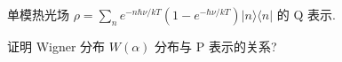 \documentclass{assignment}
\begin{document}
\begin{prob}
    单模热光场 $\rho=\sum_ne^{-n\hbar\nu/kT}(1-e^{-\hbar\nu/kT})\lvert n\rangle\langle n\rvert$ 的 Q 表示.
\end{prob}
\begin{sol}
    
\end{sol}

\begin{prob}
    证明 Wigner 分布 $W(\alpha)$ 分布与 P 表示的关系?
\end{prob}
\begin{pf}
    
\end{pf}
\end{document}
